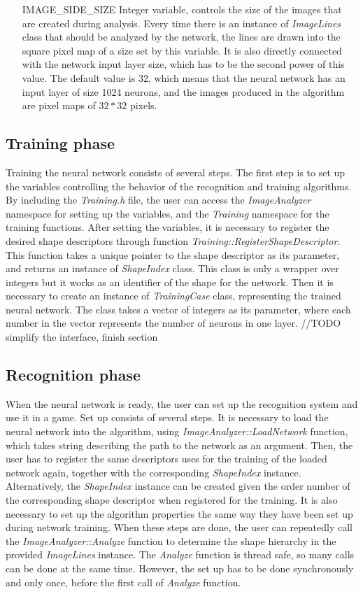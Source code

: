 \begin{enumerate}
\item [IMAGE\_SIDE\_SIZE] Integer variable, controls the size of the images that are created during analysis. Every time there is an instance of \emph{ImageLines} class that should be analyzed by the network, the lines are drawn into the square pixel map of a size set by this variable. It is also directly connected with the network input layer size, which has to be the second power of this value. The default value is 32, which means that the neural network has an input layer of size 1024 neurons, and the images produced in the algorithm are pixel maps of $32*32$ pixels.

\end{enumerate}

\subsection{Training phase}
Training the neural network consists of several steps. The first step is to set up the variables controlling the behavior of the recognition and training algorithms. By including the \emph{Training.h} file, the user can access the \emph{ImageAnalyzer} namespace for setting up the variables, and the \emph{Training} namespace for the training functions. After setting the variables, it is necessary to register the desired shape descriptors through function \emph{Training::RegisterShapeDescriptor}. This function takes a unique pointer to the shape descriptor as its parameter, and returns an instance of \emph{ShapeIndex} class. This class is only a wrapper over integers but it works as an identifier of the shape for the network. Then it is necessary to create an instance of \emph{TrainingCase} class, representing the trained neural network. The class takes a vector of integers as its parameter, where each number in the vector represents the number of neurons in one layer. 
//TODO simplify the interface, finish section

\subsection{Recognition phase}
When the neural network is ready, the user can set up the recognition system and use it in a game. Set up consists of several steps. It is necessary to load the neural network into the algorithm, using \emph{ImageAnalyzer::LoadNetwork} function, which takes string describing the path to the network as an argument. Then, the user has to register the same descriptors uses for the training of the loaded network again, together with the corresponding \emph{ShapeIndex} instance. Alternatively, the \emph{ShapeIndex} instance can be created given the order number of the corresponding shape descriptor when registered for the training. It is also necessary to set up the algorithm properties the same way they have been set up during network training. When these steps are done, the user can repeatedly call the \emph{ImageAnalyzer::Analyze} function to determine the shape hierarchy in the provided \emph{ImageLines} instance. The \emph{Analyze} function is thread safe, so many calls can be done at the same time. However, the set up has to be done synchronously and only once, before the first call of \emph{Analyze} function. 

